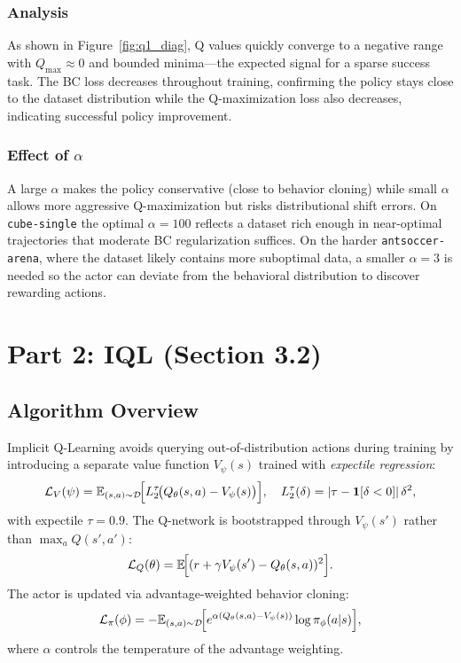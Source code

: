 \documentclass{article}
\begin{document}
\subsubsection{Analysis}
As shown in Figure~\ref{fig:q1_diag}, Q values quickly converge to a negative range with $Q_\text{max} \approx 0$ and bounded minima---the expected signal for a sparse success task. The BC loss decreases throughout training, confirming the policy stays close to the dataset distribution while the Q-maximization loss also decreases, indicating successful policy improvement.

\subsubsection{Effect of $\alpha$}
A large $\alpha$ makes the policy conservative (close to behavior cloning) while small $\alpha$ allows more aggressive Q-maximization but risks distributional shift errors. On \texttt{cube-single} the optimal $\alpha = 100$ reflects a dataset rich enough in near-optimal trajectories that moderate BC regularization suffices. On the harder \texttt{antsoccer-arena}, where the dataset likely contains more suboptimal data, a smaller $\alpha = 3$ is needed so the actor can deviate from the behavioral distribution to discover rewarding actions.

\newpage
\section{Part 2: IQL (Section 3.2)}

\subsection{Algorithm Overview}

Implicit Q-Learning \cite{iql} avoids querying out-of-distribution actions during training by introducing a separate value function $V_\psi(s)$ trained with \emph{expectile regression}:
\[
  \mathcal{L}_V(\psi)
  = \mathbb{E}_{(s,a)\sim\mathcal{D}}\!\Bigl[
      L_2^\tau\!\bigl(Q_\theta(s,a) - V_\psi(s)\bigr)
    \Bigr], \quad
  L_2^\tau(\delta) = |\tau - \mathbf{1}[\delta < 0]|\,\delta^2,
\]
with expectile $\tau = 0.9$. The Q-network is bootstrapped through $V_\psi(s')$ rather than $\max_a Q(s', a')$:
\[
  \mathcal{L}_Q(\theta)
  = \mathbb{E}\!\Bigl[(r + \gamma V_\psi(s') - Q_\theta(s,a))^2\Bigr].
\]
The actor is updated via advantage-weighted behavior cloning:
\[
  \mathcal{L}_\pi(\phi)
  = -\mathbb{E}_{(s,a)\sim\mathcal{D}}\!\Bigl[
      e^{\alpha(Q_\theta(s,a) - V_\psi(s))} \log \pi_\phi(a|s)
    \Bigr],
\]
where $\alpha$ controls the temperature of the advantage weighting.
\end{document}
